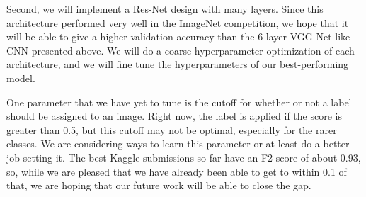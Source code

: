 \documentclass[10pt,twocolumn,letterpaper]{article}
\begin{document}
Second, we will implement a Res-Net design with many layers. Since this architecture performed very well in the ImageNet competition, we hope that it will be able to give a higher validation accuracy than the 6-layer VGG-Net-like CNN presented above. We will do a coarse hyperparameter optimization of each architecture, and we will fine tune the hyperparameters of our best-performing model.

One parameter that we have yet to tune is the cutoff for whether or not a label should be assigned to an image. Right now, the label is applied if the score is greater than 0.5, but this cutoff may not be optimal, especially for the rarer classes. We are considering ways to learn this parameter or at least do a better job setting it. The best Kaggle submissions so far have an F2 score of about 0.93, so, while we are pleased that we have already been able to get to within 0.1 of that, we are hoping that our future work will be able to close the gap.



{\small


}
\end{document}
